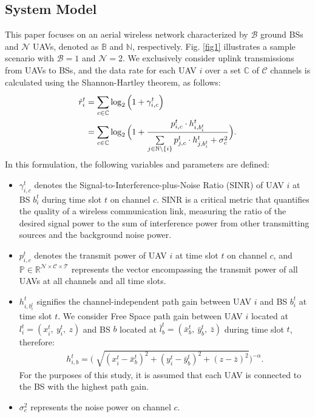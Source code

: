 \documentclass[conference]{IEEEtran}
\begin{document}
\subsection{System Model}\label{ss_sys_mdl}
This paper focuses on an aerial wireless network characterized by $\mathcal{B}$ ground BSs and $\mathcal{N}$ UAVs, denoted as $\mathbb{B}$ and $\mathbb{N}$, respectively. Fig. \ref{fig1} illustrates a sample scenario with $\mathcal{B} = 1$ and $\mathcal{N} = 2$. We exclusively consider uplink transmissions from UAVs to BSs, and the data rate for each UAV $i$ over a set $\mathbb{C}$ of $\mathcal{C}$ channels is calculated using the Shannon-Hartley theorem, as follows:
\begin{align} \label{rates}
    \dot{r}_{i}^{t} &= \sum_{c \in \mathbb{C}}^{}\log_{2}{ \Big( 1 + \gamma_{i, c}^{t} \Big) }\notag \\
    &= \sum_{c \in \mathbb{C}}^{}\log_{2}{ \Big( 1 + \frac{p_{i, c}^{t} \cdot h_{i, {b}_{i}^{t}}^{t}}{\sum\limits_{j \in \mathbb{N} \setminus \{i \} }^{}{p_{j, c}^{t} \cdot h_{j, {b}_{i}^{t}}^{t}} + {\sigma}_{c}^{2}} \Big) }.
\end{align}
In this formulation, the following variables and parameters are defined:
\begin{itemize}
    \item \(\gamma_{i, c}^{t}\) denotes the Signal-to-Interference-plus-Noise Ratio (SINR) of UAV \(i\) at BS \(b_{i}^{t}\) during time slot \(t\) on channel \(c\). SINR is a critical metric that quantifies the quality of a wireless communication link, measuring the ratio of the desired signal power to the sum of interference power from other transmitting sources and the background noise power. 
    \item $p_{i, c}^{t}$ denotes the transmit power of UAV $i$ at time slot $t$ on channel $c$, and $\mathbb{P} \in \mathbb{R}^{\mathcal{N} \times \mathcal{C} \times \mathcal{T}}$ represents the vector encompassing the transmit power of all UAVs at all channels and all time slots.
    \item $h_{i, {b}_{i}^{t}}^{t}$ signifies the channel-independent path gain between UAV $i$ and BS ${b}_{i}^{t}$ at time slot $t$. 
    We consider Free Space path gain between UAV $i$ located at $l_{i}^{t} = (x_{i}^{t}, \ y_{i}^{t}, \ z)$ and BS $b$ located at $\bar{l}_{b}^{t} = (\bar{x}_{b}^{t}, \ \bar{y}_{b}^{t}, \ \bar{z})$ during time slot $t$, therefore:
    \begin{align}\label{eq_prb}
       h_{i, b}^{t} = \Big( \sqrt[]{(x_{i}^{t} - \bar{x}_{b}^{t})^2 + (y_{i}^{t} - \bar{y}_{b}^{t})^2 + (z - \bar{z})^2} \Big)^{-\alpha}.
    \end{align}
    For the purposes of this study, it is assumed that each UAV is connected to the BS with the highest path gain.
    \item ${\sigma}_{c}^{2}$ represents the noise power on channel $c$.
\end{itemize}
\end{document}
